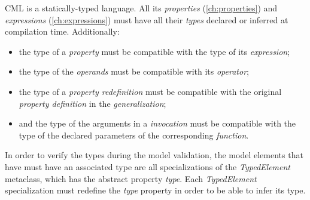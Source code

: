 CML is a statically-typed language.
All its \emph{properties} (\ref{ch:properties})
and \emph{expressions} (\ref{ch:expressions}) must have all their \emph{types} declared or inferred at compilation time.
Additionally:

\begin{itemize}
\item the type of a \emph{property} must be compatible with the type of its \emph{expression};
\item the type of the \emph{operands} must be compatible with its \emph{operator};
\item the type of a \emph{property redefinition} must be compatible with
the original \emph{property definition} in the \emph{generalization};
\item and the type of the arguments in a \emph{invocation} must be compatible with the
type of the declared parameters of the corresponding \emph{function}.
\end{itemize}

In order to verify the types during the model validation,
the model elements that have must have an associated type
are all specializations of the \emph{TypedElement} metaclass,
which has the abstract property \emph{type}.
Each \emph{TypedElement} specialization must redefine the \emph{type} property
in order to be able to infer its type.
